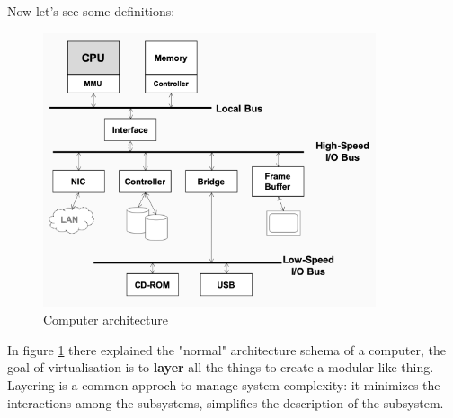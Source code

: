 Now let's see some definitions:
\begin{figure}
    \centering
    \includegraphics[scale=0.75]{images/computer architecture.png}
    \caption{Computer architecture}
    \label{fig:comparch}
\end{figure}
In figure \ref{fig:comparch} there explained the "normal" architecture schema of a computer, the goal of virtualisation is to \textbf{layer} all the things to create a modular like thing. Layering is a common approch to manage system complexity: it minimizes the interactions among the subsystems, simplifies the description of the subsystem. 

